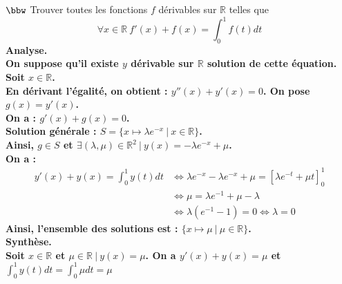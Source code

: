 \documentclass[11pt]{article}
\begin{document}
\begin{exercice}{$\bbw$}{}
    Trouver toutes les fonctions $f$ dérivables sur $\mathbb{R}$ telles que
    \begin{equation*}
        \forall{x \in \mathbb{R}} ~ f'(x) + f(x) = \int_0^1{f(t)dt}
    \end{equation*}
    \tcblower
    \bf{Analyse.}\\
    On suppose qu'il existe $y$ dérivable sur $\mathbb{R}$ solution de cette équation.\\[0.1cm]
    Soit $x\in\mathbb{R}$.\\
    En dérivant l'égalité, on obtient : $y''(x) + y'(x) = 0$. On pose $g(x)=y'(x)$.\\
    On a : $g'(x) + g(x) = 0$.\\
    Solution générale : $S = \{x\mapsto \lambda e^{-x} ~ | ~ x\in\mathbb{R}\}$.\\
    Ainsi, $g \in S$ et $\exists (\lambda, \mu) \in \mathbb{R}^2 ~ | ~ y(x) = -\lambda e^{-x} + \mu$.\\
    On a :
    \begin{align*}
        y'(x) + y(x) = \int_0^1y(t)dt &\iff \lambda e^{-x} - \lambda e^{-x} + \mu = \left[\lambda e^{-t} + \mu t\right]_0^1\\
        &\iff \mu = \lambda e^{-1} + \mu - \lambda\\
        &\iff \lambda(e^{-1} -1) = 0
        \iff \lambda = 0
    \end{align*}
    Ainsi, l'ensemble des solutions est : $\{x\mapsto\mu ~ | ~ \mu \in \mathbb{R}\}$.\\
    \bf{Synthèse}.\\
    Soit $x\in\mathbb{R}$ et $\mu\in\mathbb{R} ~ | ~ y(x)=\mu$. On a $y'(x) + y(x) = \mu$ et $\int_0^1y(t)dt=\int_0^1\mu dt=\mu$
\end{exercice}
\end{document}
